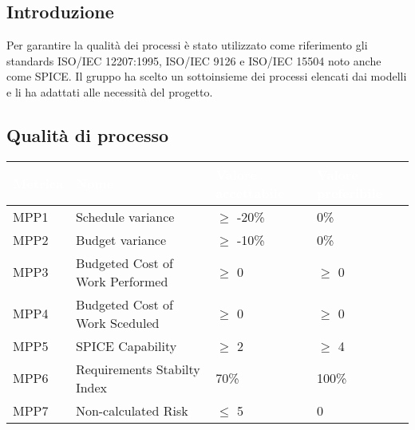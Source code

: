 \subsection{Introduzione}
Per garantire la qualità dei processi è stato utilizzato come riferimento gli standards 
ISO/IEC 12207:1995, ISO/IEC 9126 e ISO/IEC 15504 noto anche come SPICE.
Il gruppo ha scelto un sottoinsieme dei processi elencati dai modelli e li ha adattati alle 
necessità del progetto.

\subsection{Qualità di processo}
{

    \setlength{\freewidth}{\dimexpr\textwidth-10\tabcolsep}
    \renewcommand{\arraystretch}{1.5}
    \centering
    \setlength{\aboverulesep}{0pt}
    \setlength{\belowrulesep}{0pt}
    \begin{longtable}{C{.257\freewidth} C{.257\freewidth} C{.257\freewidth} C{.257\freewidth}}
       \toprule
    \textcolor{white}{\textbf{Metrica}}&
    \textcolor{white}{\textbf{Nome}}&
    \textcolor{white}{\textbf{Valore accettabile}}&
    \textcolor{white}{\textbf{Valore preferibile}}\\	
    \toprule
    \endhead
    
    
    MPP1 & Schedule variance & $\geq$ -20\% & 0\% \\
    MPP2 & Budget variance & $\geq$ -10\% & 0\% \\
    MPP3 & Budgeted Cost of Work Performed & $\geq$ 0 & $\geq$ 0 \\
    MPP4 & Budgeted Cost of Work Sceduled & $\geq$ 0 & $\geq$ 0 \\
    MPP5 & SPICE Capability & $\geq$ 2 & $\geq$ 4 \\
    MPP6 & Requirements Stabilty Index & 70\% & 100\% \\
    MPP7 & Non-calculated Risk & $\leq$ 5 & 0 \\	   
    \bottomrule
    \end{longtable}
}

